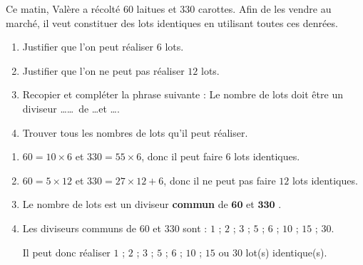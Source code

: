 \begin{exercice*}
    Ce matin, Valère a récolté $60$ laitues et $330$ carottes. Afin de les vendre au marché, il veut
constituer des lots identiques en utilisant toutes ces denrées.
    \begin{enumerate}
        \item Justifier que l'on peut réaliser $6$ lots.
        \item Justifier que l'on ne peut pas réaliser $12$ lots.
        \item Recopier et compléter la phrase suivante : \og Le nombre de lots doit être un diviseur \dots\dots~de \dots et \dots .\fg
        \item Trouver tous les nombres de lots qu'il peut réaliser.
    \end{enumerate}
\end{exercice*}
\begin{corrige}
    \begin{enumerate}
        \item $60 = 10\times 6$ et $330 = 55\times 6$, donc il peut faire $6$ lots identiques.
        \item $60 = 5\times 12$ et $330 = 27\times 12 + 6$, donc il ne peut pas faire $12$ lots identiques.        
        \item \og Le nombre de lots est un diviseur \textbf{commun} de $\mathbf{60}$ et $\mathbf{330}$ .\fg
        \item Les diviseurs communs de $60$ et $330$ sont : $1$ ; $2$ ; $3$ ; $5$ ; $6$ ; $10$ ; $15$ ; $30$.
        
        Il peut donc réaliser $1$ ; $2$ ; $3$ ; $5$ ; $6$ ; $10$ ; $15$ ou $30$ lot(s) identique(s).
    \end{enumerate}
\end{corrige}


